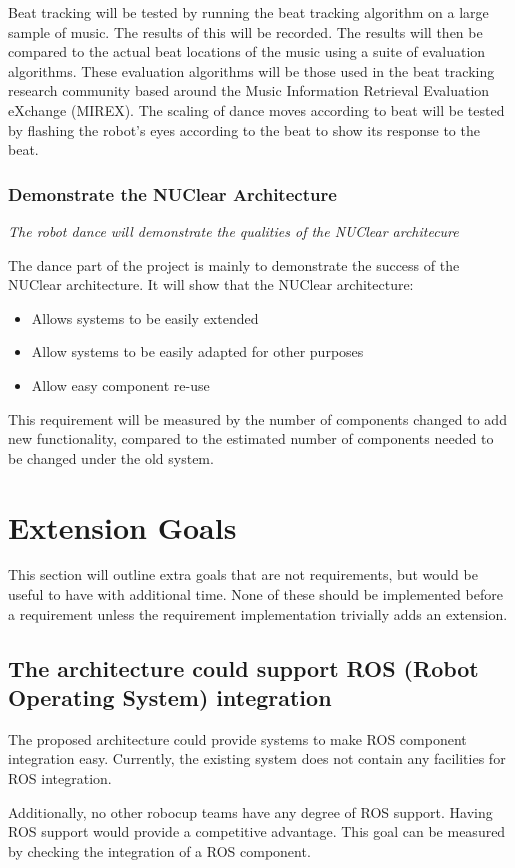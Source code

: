 \documentclass[english,12pt]{scrartcl}
\newcommand{\requirement}[1]{\textit{#1}}
\begin{document}
				Beat tracking will be tested by running the beat tracking algorithm on a large sample of music.
				The results of this will be recorded. The results will then be compared to the actual beat locations of the music using a suite of evaluation algorithms.
				These evaluation algorithms will be those used in the beat tracking research community based around the Music Information Retrieval Evaluation eXchange (MIREX).
				The scaling of dance moves according to beat will be tested by flashing the robot’s eyes according to the beat to show its response to the beat.
				
			\subsubsection{Demonstrate the NUClear Architecture}
				\requirement{The robot dance will demonstrate the qualities of the NUClear architecure}

				The dance part of the project is mainly to demonstrate the success of the NUClear architecture. It will show that the NUClear architecture:
				\begin{itemize}
					\item{Allows systems to be easily extended}
					\item{Allow systems to be easily adapted for other purposes}
					\item{Allow easy component re-use}
				\end{itemize}
				
				This requirement will be measured by the number of components changed to add new functionality, compared to the estimated number of components needed to be changed under the old system.

	\section{Extension Goals}
		This section will outline extra goals that are not requirements, but would be useful to have with additional time.
		None of these should be implemented before a requirement unless the requirement implementation trivially adds an extension.

		\subsection{The architecture could support ROS (Robot Operating System) integration}
			The proposed architecture could provide systems to make ROS component integration easy.
			Currently, the existing system does not contain any facilities for ROS integration.
			
			Additionally, no other \gls{robocup} teams have any degree of ROS support.
			Having ROS support would provide a competitive advantage.
			This goal can be measured by checking the integration of a ROS component.

	
	
	
	\printglossaries
\end{document}
